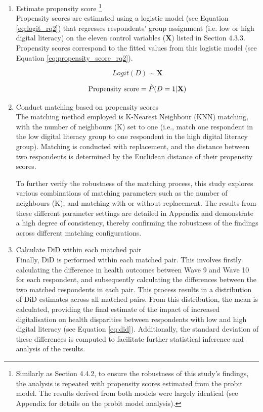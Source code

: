 \begin{enumerate}[wide=0pt, leftmargin=*, labelwidth=0pt, labelindent=\parindent, itemindent=0pt]
    \item Estimate propensity score \footnote{Similarly as Section 4.4.2, to ensure the robustness of this study's findings, the analysis is repeated with propensity scores estimated from the probit model. The results derived from both models were largely identical (see Appendix for details on the probit model analysis).} \\
    Propensity scores are estimated using a logistic model (see Equation \ref{eq:logit_rq2}) that regresses respondents' group assignment (i.e. low or high digital literacy) on the eleven control variables (\textbf{X}) listed in Section 4.3.3. Propensity scores correspond to the fitted values from this logistic model (see Equation \ref{eq:propensity_score_rq2}).

    \begin{equation}
        \label{eq:logit_rq2}
        Logit(D) \sim \textbf{X}
    \end{equation}
    
    \begin{equation}
        \label{eq:propensity_score_rq2}
        \textnormal{Propensity score} = \hat{P}(D = 1 | \textbf{X})
    \end{equation}

    \item Conduct matching based on propensity scores \\
    The matching method employed is K-Nearest Neighbour (KNN) matching, with the number of neighbours (K) set to one (i.e., match one respondent in the low digital literacy group to one respondent in the high digital literacy group). Matching is conducted with replacement, and the distance between two respondents is determined by the Euclidean distance of their propensity scores.  

    To further verify the robustness of the matching process, this study explores various combinations of matching parameters such as the number of neighbours (K), and matching with or without replacement. The results from these different parameter settings are detailed in Appendix and demonstrate a high degree of consistency, thereby confirming the robustness of the findings across different matching configurations.

    \item Calculate DiD within each matched pair \\
    Finally, DiD is performed within each matched pair. This involves firstly calculating the difference in health outcomes between Wave 9 and Wave 10 for each respondent, and subsequently calculating the differences between the two matched respondents in each pair. This process results in a distribution of DiD estimates across all matched pairs. From this distribution, the mean is calculated, providing the final estimate of the impact of increased digitalisation on health disparities between respondents with low and high digital literacy (see Equation \ref{eq:did}). Additionally, the standard deviation of these differences is computed to facilitate further statistical inference and analysis of the results.


\end{enumerate}
